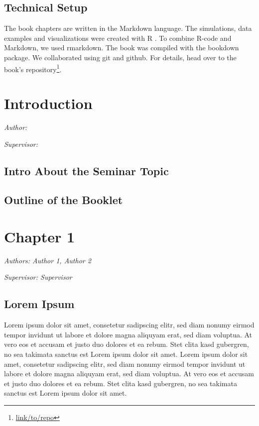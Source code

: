 \documentclass[]{krantz}
\renewcommand{\href}[2]{#2\footnote{\url{#1}}}
\begin{document}
\hypertarget{technical-setup}{%
\section*{Technical Setup}\label{technical-setup}}


The book chapters are written in the Markdown language.
The simulations, data examples and visualizations were created with R \citep{rlang}.
To combine R-code and Markdown, we used rmarkdown.
The book was compiled with the bookdown package.
We collaborated using git and github.
For details, head over to the \href{link/to/repo}{book's repository}.

\hypertarget{introduction}{%
\chapter{Introduction}\label{introduction}}

\emph{Author: }

\emph{Supervisor: }

\hypertarget{intro-about-the-seminar-topic}{%
\section{Intro About the Seminar Topic}\label{intro-about-the-seminar-topic}}

\hypertarget{outline-of-the-booklet}{%
\section{Outline of the Booklet}\label{outline-of-the-booklet}}

\hypertarget{chapter-1}{%
\chapter{Chapter 1}\label{chapter-1}}

\emph{Authors: Author 1, Author 2}

\emph{Supervisor: Supervisor}

\hypertarget{lorem-ipsum}{%
\section{Lorem Ipsum}\label{lorem-ipsum}}

Lorem ipsum dolor sit amet, consetetur sadipscing elitr, sed diam nonumy eirmod tempor invidunt ut labore et dolore magna aliquyam erat, sed diam voluptua. At vero eos et accusam et justo duo dolores et ea rebum. Stet clita kasd gubergren, no sea takimata sanctus est Lorem ipsum dolor sit amet. Lorem ipsum dolor sit amet, consetetur sadipscing elitr, sed diam nonumy eirmod tempor invidunt ut labore et dolore magna aliquyam erat, sed diam voluptua. At vero eos et accusam et justo duo dolores et ea rebum. Stet clita kasd gubergren, no sea takimata sanctus est Lorem ipsum dolor sit amet.
\end{document}
